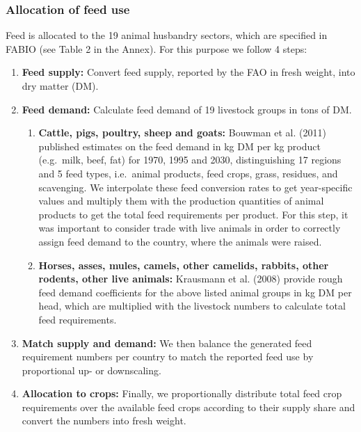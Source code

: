 \documentclass[]{article}
\providecommand{\tightlist}{%
  \setlength{\itemsep}{0pt}\setlength{\parskip}{0pt}}
\begin{document}
\subsubsection{Allocation of feed use}\label{allocation-of-feed-use}

Feed is allocated to the 19 animal husbandry sectors, which are
specified in FABIO (see Table 2 in the Annex). For this purpose we
follow 4 steps:

\begin{enumerate}
\def\labelenumi{\arabic{enumi}.}
\item
  \textbf{Feed supply:} Convert feed supply, reported by the FAO in
  fresh weight, into dry matter (DM).
\item
  \textbf{Feed demand:} Calculate feed demand of 19 livestock groups in
  tons of DM.

  \begin{enumerate}
  \def\labelenumii{\alph{enumii})}
  \tightlist
  \item
    \textbf{Cattle, pigs, poultry, sheep and goats:} Bouwman et al.
    (2011) published estimates on the feed demand in kg DM per kg
    product (e.g.~milk, beef, fat) for 1970, 1995 and 2030,
    distinguishing 17 regions and 5 feed types, i.e.~animal products,
    feed crops, grass, residues, and scavenging. We interpolate these
    feed conversion rates to get year-specific values and multiply them
    with the production quantities of animal products to get the total
    feed requirements per product. For this step, it was important to
    consider trade with live animals in order to correctly assign feed
    demand to the country, where the animals were raised.
  \item
    \textbf{Horses, asses, mules, camels, other camelids, rabbits, other
    rodents, other live animals:} Krausmann et al. (2008) provide rough
    feed demand coefficients for the above listed animal groups in kg DM
    per head, which are multiplied with the livestock numbers to
    calculate total feed requirements.
  \end{enumerate}
\item
  \textbf{Match supply and demand:} We then balance the generated feed
  requirement numbers per country to match the reported feed use by
  proportional up- or downscaling.
\item
  \textbf{Allocation to crops:} Finally, we proportionally distribute
  total feed crop requirements over the available feed crops according
  to their supply share and convert the numbers into fresh weight.
\end{enumerate}
\end{document}
